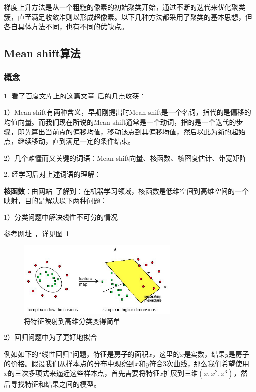 \documentclass[12pt]{article}
\begin{document}
梯度上升方法是从一个粗糙的像素的初始聚类开始，通过不断的迭代来优化聚类簇，直至满足收敛准则以形成超像素。以下几种方法都采用了聚类的基本思想，但各自具体方法不同，也有不同的优缺点。

\subsection{Mean shift算法}

\subsubsection{概念}

1. 看了百度文库上的这篇文章~\cite{MeanShiftIntroduction}后的几点收获：

1）Mean shift有两种含义，早期刚提出时Mean shift是一个名词，指代的是偏移的均值向量。而我们现在所说的Mean shift通常是一个动词，指的是一个迭代的步骤，即先算出当前点的偏移均值，移动该点到其偏移均值，然后以此为新的起始点，继续移动，直到满足一定的条件结束。

2）几个难懂而又关键的词语：Mean shift向量、核函数、核密度估计、带宽矩阵

2. 经学习后对上述词语的理解： 

\textbf{核函数}：由网站~\cite{KernelFunction}了解到：在机器学习领域，核函数是低维空间到高维空间的一个映射，目的是解决以下两种问题：

1）分类问题中解决线性不可分的情况

参考网址~\cite{KernelExample}，详见图~\ref{fig: kernel}

\begin{figure}[!ht]
\centering
\includegraphics[width=0.7\textwidth]{kernel.png}
\caption{将特征映射到高维分类变得简单}
\label{fig: kernel}
\end{figure} 

2）回归问题中为了更好地拟合

例如如下的“线性回归”问题，特征是房子的面积$x$，这里的$x$是实数，结果$y$是房子的价格。假设我们从样本点的分布中观察到$x$和$y$符合$3$次曲线，那么我们希望使用$x$的三次多项式来逼近这些样本点，首先需要将特征$x$扩展到三维$(x, x^2, x^3)$，然后寻找特征和结果之间的模型。
\end{document}
